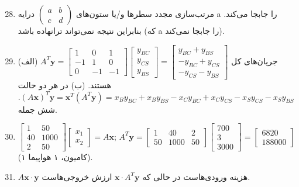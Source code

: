 \documentclass[12pt,a4paper]{article}
\begin{document}
{		
		\begin{enumerate}
			\setcounter{enumi}{27}
			\item مرتب‌سازی مجدد سطرها و/یا ستون‌های $\begin{pmatrix} a & b \\ c & d \end{pmatrix}$ درایه a را جابجا می‌کند. بنابراین نتیجه نمی‌تواند ترانهاده باشد (که a را جابجا نمی‌کند).
			
			\item (الف) جریان‌های کل $A^T\boldsymbol{y} = \begin{bmatrix} 1 & 0 & 1 \\ -1 & 1 & 0 \\ 0 & -1 & -1 \end{bmatrix} \begin{bmatrix} y_{BC} \\ y_{CS} \\ y_{BS} \end{bmatrix} = \begin{bmatrix} y_{BC}+y_{BS} \\ -y_{BC}+y_{CS} \\ -y_{CS}-y_{BS} \end{bmatrix}$ هستند.
			(ب) در هر دو حالت $(A\boldsymbol{x})^T\boldsymbol{y} = \boldsymbol{x}^T(A^T\boldsymbol{y}) = x_B y_{BC} + x_B y_{BS} - x_C y_{BC} + x_C y_{CS} - x_S y_{CS} - x_S y_{BS}$. شش جمله.
			
			\item $\begin{bmatrix} 1 & 50 \\ 40 & 1000 \\ 2 & 50 \end{bmatrix} \begin{bmatrix} x_1 \\ x_2 \end{bmatrix} = A\boldsymbol{x}$; $A^T\boldsymbol{y} = \begin{bmatrix} 1 & 40 & 2 \\ 50 & 1000 & 50 \end{bmatrix} \begin{bmatrix} 700 \\ 3 \\ 3000 \end{bmatrix} = \begin{bmatrix} 6820 \\ 188000 \end{bmatrix}$ (۱ کامیون، ۱ هواپیما).
			
			\item $A\boldsymbol{x} \cdot \boldsymbol{y}$ هزینه ورودی‌هاست در حالی که $\boldsymbol{x} \cdot A^T\boldsymbol{y}$ ارزش خروجی‌هاست.
			

\end{enumerate}}
\end{document}

